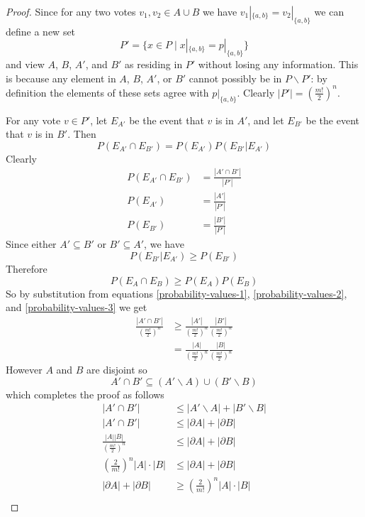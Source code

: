 \begin{proof}
		Since for any two votes $v_1, v_2 \in A \cup B$ we have $v_1|_{\{a,b\}} = v_2|_{\{a,b\}}$ we can define a new set
		\[
			P' = \{x \in P \mid x|_{\{a,b\}} = p|_{\{a,b\}}\}
		\]
		and view $A$, $B$, $A'$, and $B'$ as residing in $P'$ without losing any information. This is because any element in $A$, $B$, $A'$, or $B'$ cannot possibly be in $P \backslash P'$: by definition the elements of these sets agree with $p|_{\{a,b\}}$. Clearly $|P'| = (\frac{m!}{2})^n$.

		For any vote $v \in P'$, let $E_{A'}$ be the event that $v$ is in $A'$, and let $E_{B'}$ be the event that $v$ is in $B'$. Then
		\[
			P(E_{A'} \cap E_{B'}) = P(E_{A'}) P(E_{B'}|E_{A'})
		\]
		Clearly
		\begin{align}
			\label{probability-values-1}
			P(E_{A'} \cap E_{B'}) &= \frac{|A' \cap B'|}{|P'|} \\
			\label{probability-values-2}
			P(E_{A'}) &= \frac{|A'|}{|P'|} \\
			\label{probability-values-3}
			P(E_{B'}) &= \frac{|B'|}{|P'|}
		\end{align}
		Since either $A' \subseteq B'$ or $B' \subseteq A'$, we have
		\[
			P(E_{B'}|E_{A'}) \ge P(E_{B'})
		\]
		Therefore
		\[
			P(E_A \cap E_B) \ge P(E_A) P(E_B)
		\]
		So by substitution from equations \ref{probability-values-1}, \ref{probability-values-2}, and \ref{probability-values-3} we get
		\begin{align*}
			\frac{|A' \cap B'|}{(\frac{m!}{2})^n} &\ge \frac{|A'|}{(\frac{m!}{2})^n} \frac{|B'|}{(\frac{m!}{2})^n} \\
			&= \frac{|A|}{(\frac{m!}{2})^n} \frac{|B|}{(\frac{m!}{2})^n}
		\end{align*}
		However $A$ and $B$ are disjoint so
		\[
			A' \cap B' \subseteq (A' \backslash A) \cup (B' \backslash B)
		\]
		which completes the proof as follows
		\begin{align*}
			|A' \cap B'| &\le |A' \backslash A| + |B' \backslash B| \\
			|A' \cap B'| &\le |\partial A| + |\partial B| \\
			\frac{|A||B|}{(\frac{m!}{2})^n} &\le |\partial A| + |\partial B| \\
			\left(\frac{2}{m!}\right)^n |A| \cdot |B| &\le |\partial A| + |\partial B| \\
			|\partial A| + |\partial B| &\ge \left(\frac{2}{m!}\right)^n |A| \cdot |B| \\
		\end{align*}
	\end{proof}

